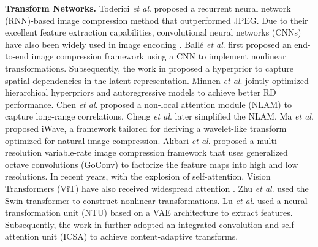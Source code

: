 \textbf{Transform Networks.} Toderici \textit{et al}. \cite{toderici2015variable,toderici2017full} proposed a recurrent neural network (RNN)-based image compression method that outperformed JPEG. Due to their excellent feature extraction capabilities, convolutional neural networks (CNNs) have also been widely used in image encoding \cite{theis2017lossy,balle2018variational,cheng2020learned,chen2021end,jiang23}. Ballé \textit{et al}. \cite{balle2016end} first proposed an end-to-end image compression framework using a CNN to implement nonlinear transformations. Subsequently, the work in \cite{balle2018variational} proposed a hyperprior to capture spatial dependencies in the latent representation. Minnen \textit{et al}. \cite{minnen2018joint} jointly optimized hierarchical hyperpriors and autoregressive models to achieve better RD performance. Chen \textit{et al}. \cite{chen2021end} proposed a non-local attention module (NLAM) to capture long-range correlations. Cheng \textit{et al}. \cite{cheng2020learned} later simplified the NLAM. Ma \textit{et al}. \cite{8931632} proposed iWave, a framework tailored for deriving a wavelet-like transform optimized for natural image compression. Akbari \textit{et al}. \cite{9385968} proposed a multi-resolution variable-rate image compression framework that uses generalized octave convolutions (GoConv) to factorize the feature maps into high and low resolutions. In recent years, with the explosion of self-attention, Vision Transformers (ViT) have also received widespread attention \cite{zhu2022transformer,lu2021transformer,lu2022high}. Zhu \textit{et al}. \cite{zhu2022transformer} used the Swin transformer \cite{liu2021swin} to construct nonlinear transformations. Lu \textit{et al}. \cite{lu2021transformer} used a neural transformation unit (NTU) based on a VAE architecture to extract features. Subsequently, the work in \cite{lu2022high} further adopted an integrated convolution and self-attention unit (ICSA) to achieve content-adaptive transforms.

